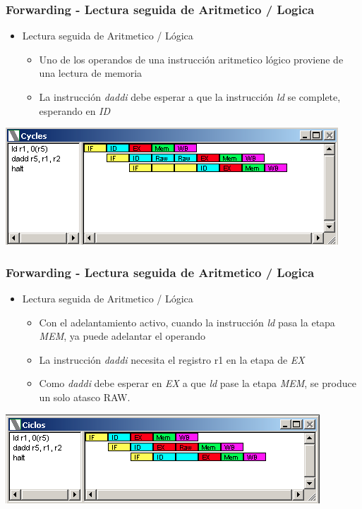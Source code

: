 \documentclass{beamer}
\begin{document}
\begin{frame}[fragile]
\frametitle{Forwarding - Lectura seguida de Aritmetico / Logica}
\begin{itemize}
\item Lectura seguida de Aritmetico / Lógica
\begin{itemize}
\item Uno de los operandos de una instrucción aritmetico lógico proviene de una lectura de memoria
\item La instrucción \emph{daddi} debe esperar a que la instrucción \emph{ld} se complete, esperando en \emph{ID}
\end{itemize}
\end{itemize}
\includegraphics[scale=0.45]{forwarding-2.png}
\end{frame}

\begin{frame}[fragile]
\frametitle{Forwarding - Lectura seguida de Aritmetico / Logica}
\begin{itemize}
\item Lectura seguida de Aritmetico / Lógica
\begin{itemize}
\item Con el adelantamiento activo, cuando la instrucción \emph{ld} pasa la etapa \emph{MEM}, ya puede adelantar el operando
\item La instrucción \emph{daddi} necesita el registro r1 en la etapa de \emph{EX}
\item Como \emph{daddi} debe esperar en \emph{EX} a que \emph{ld} pase la etapa \emph{MEM}, se produce un solo atasco RAW.
\end{itemize}
\end{itemize}
\includegraphics[scale=0.45]{forwarding-2-lectura-aritm.png}
\end{frame}
\end{document}

